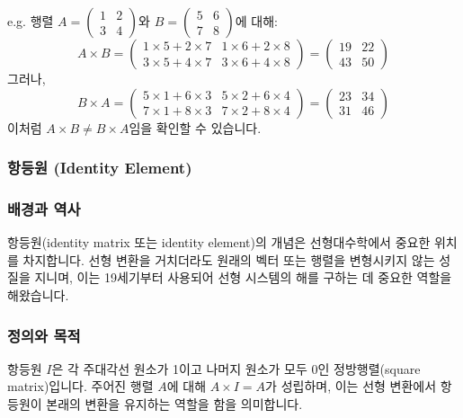 \vspace{1\baselineskip}
\noindent {} e.g.
행렬 \( A = \begin{pmatrix} 1 & 2 \\ 3 & 4 \end{pmatrix} \)와 \( B = \begin{pmatrix} 5 & 6 \\ 7 & 8 \end{pmatrix} \)에 대해:
\[
  A \times B = \begin{pmatrix} 1 \times 5 + 2 \times 7 & 1 \times 6 + 2 \times 8 \\ 3 \times 5 + 4 \times 7 & 3 \times 6 + 4 \times 8 \end{pmatrix} = \begin{pmatrix} 19 & 22 \\ 43 & 50 \end{pmatrix}
\]
그러나,
\[
  B \times A = \begin{pmatrix} 5 \times 1 + 6 \times 3 & 5 \times 2 + 6 \times 4 \\ 7 \times 1 + 8 \times 3 & 7 \times 2 + 8 \times 4 \end{pmatrix} = \begin{pmatrix} 23 & 34 \\ 31 & 46 \end{pmatrix}
\]
이처럼 \( A \times B \neq B \times A \)임을 확인할 수 있습니다.

\subsubsection{항등원 (Identity Element)}

\subsubsection{배경과 역사}
항등원(identity matrix 또는 identity element)의 개념은 선형대수학에서 중요한 위치를 차지합니다. 선형 변환을 거치더라도 원래의 벡터 또는 행렬을 변형시키지 않는 성질을 지니며, 이는 19세기부터 사용되어 선형 시스템의 해를 구하는 데 중요한 역할을 해왔습니다.

\subsubsection{정의와 목적}
항등원 \( I \)은 각 주대각선 원소가 1이고 나머지 원소가 모두 0인 정방행렬(square matrix)입니다. 주어진 행렬 \( A \)에 대해 \( A \times I = A \)가 성립하며, 이는 선형 변환에서 항등원이 본래의 변환을 유지하는 역할을 함을 의미합니다.


